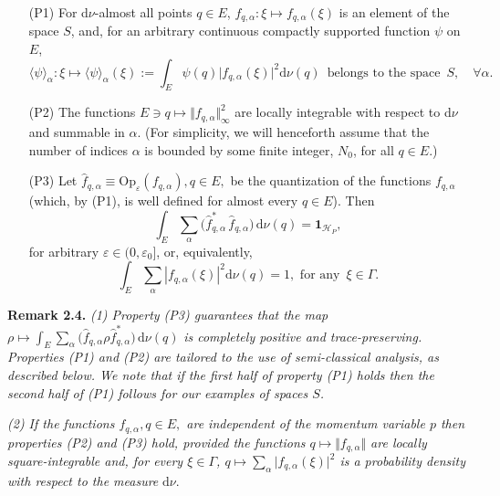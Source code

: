 \documentclass[12pt]{article}
\begin{document}
\vspace{0.15cm}
\begin{enumerate}
\item[(P1)]{For d$\nu$-almost all points $q\in E$, $f_{q, \alpha}: \xi \mapsto f_{q, \alpha}(\xi)$ is an element of the space $S$, and, 
for an arbitrary continuous compactly supported function $\psi$ on $E$,
$$\langle \psi \rangle_{\alpha}: \xi \mapsto \langle \psi\rangle_{\alpha}(\xi) :=\int_{E} \psi(q) \vert f_{q, \alpha}(\xi) \vert^{2} \text{d}\nu(q) \,\text{ belongs to the space }\, S, \quad \forall \alpha.$$}
\item[(P2)]{The functions $E\ni q \mapsto \Vert f_{q,\alpha} \Vert^{2}_\infty$ are locally integrable with respect to d$\nu$ 
and summable in $\alpha$. (For simplicity, we will henceforth assume that the number of indices $\alpha$ is bounded
 by some finite integer, $N_0$, for all $q\in E$.)}
\item[(P3)]{Let $\widehat{f}_{q,\alpha} \equiv \text{Op}_{\varepsilon}(f_{q, \alpha}), q\in E,$ be the quantization of the functions 
$f_{q, \alpha}$ (which, by (P1), is well defined for almost every $q\in E$). Then
\begin{equation}\label{tracepres}
\int_{E} \sum_{\alpha}\Big(\widehat{f}_{q, \alpha}^{*}\,\widehat{f}_{q,\alpha}\Big) \,\text{d}\nu(q) = \mathbf{1}_{\mathcal{H}_P},
\end{equation}
for arbitrary $\varepsilon \in (0, \varepsilon_0]$, or, equivalently,}
$$\int_E\sum_{\alpha}|f_{q,\alpha}(\xi)|^2\text{d} \nu(q)=1, \text{ for any }\, \xi\in \Gamma. $$
\end{enumerate}
{\bf{Remark 2.4.}} \textit{(1) Property (P3) guarantees that the map}
$\rho \mapsto \int_{E} \sum_{\alpha}\big(\widehat{f}_{q, \alpha} \rho \widehat{f}_{q, \alpha}^{*}\big)\,\text{d}\nu(q)$ 
\textit{is completely positive and trace-preserving. Properties (P1) and (P2) are tailored to the use of semi-classical 
analysis, as described below. We note that if the first half of property (P1) holds then the second half of
(P1) follows for our examples of spaces $S$.}

\textit{(2) If the functions $f_{q, \alpha}, q\in E,$ are \textit{independent} of the momentum variable $p$ then properties
(P2) and (P3) hold, provided the functions $q\mapsto \Vert f_{q, \alpha}\Vert$ are locally square-integrable and, 
for every $\xi\in \Gamma$, $q\mapsto \sum_{\alpha} \vert f_{q, \alpha}(\xi) \vert^{2}$ is a probability density with respect to the measure} $\text{d}\nu$.
\end{document}

